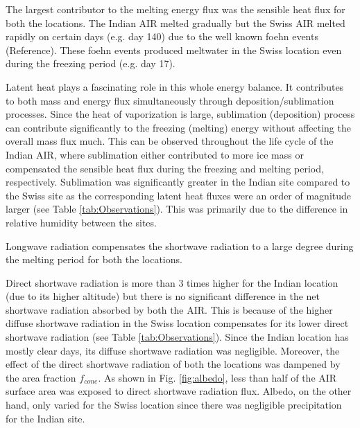 \documentclass[utf8]{frontiersSCNS} %
\begin{document}
The largest contributor to the melting energy flux was the sensible heat flux for both the locations. The Indian
AIR melted gradually but the Swiss AIR melted rapidly on certain days (e.g.  day 140) due to the well known foehn
events (Reference). These foehn events produced meltwater in the Swiss location even during the freezing period
(e.g.  day 17).

Latent heat plays a fascinating role in this whole energy balance. It contributes to both mass and energy flux
simultaneously through deposition/sublimation processes. Since the heat of vaporization is large, sublimation
(deposition) process can contribute significantly to the freezing (melting) energy without affecting the overall
mass flux much. This can be observed throughout the life cycle of the Indian AIR, where sublimation either
contributed to more ice mass or compensated the sensible heat flux during the freezing and melting period,
respectively. Sublimation was significantly greater in the Indian site compared to the Swiss site as the
corresponding latent heat fluxes were an order of magnitude larger (see Table \ref{tab:Observations}). This was
primarily due to the difference in relative humidity between the sites.

Longwave radiation compensates the shortwave radiation to a large degree during the melting period for both the
locations.

Direct shortwave radiation is more than 3 times higher for the Indian location (due to its higher altitude) but
there is no significant difference in the net shortwave radiation absorbed by both the AIR. This is because of the
higher diffuse shortwave radiation in the Swiss location compensates for its lower direct shortwave radiation (see
Table \ref{tab:Observations}).  Since the Indian location has mostly clear days, its diffuse shortwave radiation
was negligible. Moreover, the effect of the direct shortwave radiation of both the locations was dampened by the
area fraction $f_{cone}$. As shown in Fig. \ref{fig:albedo}, less than half of the AIR surface area was exposed to
direct shortwave radiation flux.  Albedo, on the other hand, only varied for the Swiss location since there was
negligible precipitation for the Indian site.
\end{document}
